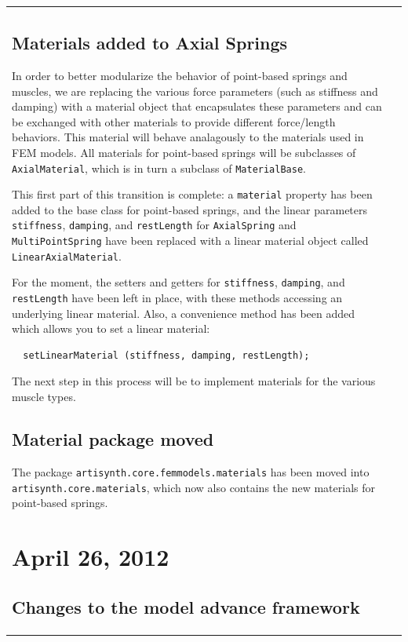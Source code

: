 \documentclass{article}
\begin{document}
\begin{tabular}{ll}
\subsection*{Materials added to Axial Springs}

In order to better modularize the behavior of point-based springs and
muscles, we are replacing the various force parameters (such as
stiffness and damping) with a material object that encapsulates these
parameters and can be exchanged with other materials to provide
different force/length behaviors. This material will behave
analagously to the materials used in FEM models. All materials for
point-based springs will be subclasses of {\tt AxialMaterial}, which is in
turn a subclass of {\tt MaterialBase}.

This first part of this transition is complete: a {\tt material} property
has been added to the base class for point-based springs, and the
linear parameters {\tt stiffness}, {\tt damping}, and {\tt restLength} for
{\tt AxialSpring} and {\tt MultiPointSpring} have been replaced with a linear
material object called {\tt LinearAxialMaterial}.

For the moment, the setters and getters for {\tt stiffness}, {\tt damping},
and {\tt restLength} have been left in place, with these methods accessing
an underlying linear material. Also, a convenience method has been
added which allows you to set a linear material:

\begin{verbatim}
  setLinearMaterial (stiffness, damping, restLength);
\end{verbatim}

The next step in this process will be to implement materials for the
various muscle types.

\subsection*{Material package moved}

The package {\tt artisynth.core.femmodels.materials} has been moved into
{\tt artisynth.core.materials}, which now also contains the new materials for
point-based springs.

\section*{April 26, 2012}

\subsection*{Changes to the model advance framework}


\end{tabular}
\end{document}
